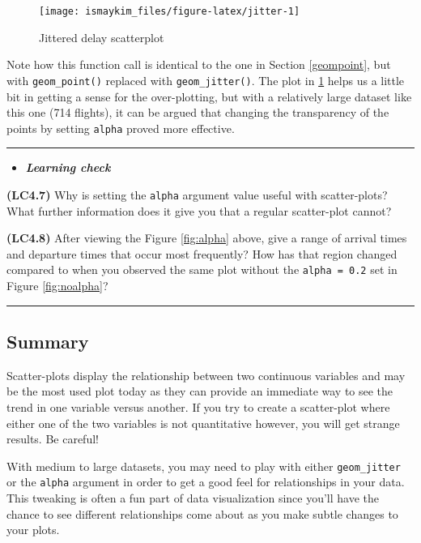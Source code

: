 \documentclass[]{tufte-book}
\let\oldrule=\rule
\renewcommand{\rule}[1]{\oldrule{\linewidth}}
\newenvironment{rmdblock}[1]
  {\begin{shaded*}
  \begin{itemize}
  \renewcommand{\labelitemi}{
    \raisebox{-.7\height}[0pt][0pt]{
    }
  }
  \item
  }
  {
  \end{itemize}
  \end{shaded*}
  }
\newenvironment{learncheck}
  {\begin{rmdblock}{warning}}
  {\end{rmdblock}}
\begin{document}
\begin{figure}

{\centering \texttt{[image: ismaykim\_files/figure-latex/jitter-1]} 

}

\caption[Jittered delay scatterplot]{Jittered delay scatterplot}\label{fig:jitter}
\end{figure}

Note how this function call is identical to the one in Section
\ref{geompoint}, but with \texttt{geom\_point()} replaced with
\texttt{geom\_jitter()}. The plot in \ref{fig:jitter} helps us a little
bit in getting a sense for the over-plotting, but with a relatively
large dataset like this one (714 flights), it can be argued that
changing the transparency of the points by setting \texttt{alpha} proved
more effective.

\begin{center}\rule{0.5\linewidth}{\linethickness}\end{center}

\begin{learncheck}
\textbf{\emph{Learning check}}
\end{learncheck}

\textbf{(LC4.7)} Why is setting the \texttt{alpha} argument value useful
with scatter-plots? What further information does it give you that a
regular scatter-plot cannot?

\textbf{(LC4.8)} After viewing the Figure \ref{fig:alpha} above, give a
range of arrival times and departure times that occur most frequently?
How has that region changed compared to when you observed the same plot
without the \texttt{alpha\ =\ 0.2} set in Figure \ref{fig:noalpha}?

\begin{center}\rule{0.5\linewidth}{\linethickness}\end{center}

\subsection{Summary}\label{summary}

Scatter-plots display the relationship between two continuous variables
and may be the most used plot today as they can provide an immediate way
to see the trend in one variable versus another. If you try to create a
scatter-plot where either one of the two variables is not quantitative
however, you will get strange results. Be careful!

With medium to large datasets, you may need to play with either
\texttt{geom\_jitter} or the \texttt{alpha} argument in order to get a
good feel for relationships in your data. This tweaking is often a fun
part of data visualization since you'll have the chance to see different
relationships come about as you make subtle changes to your plots.
\end{document}
